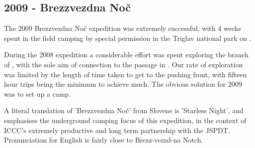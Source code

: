 \begin{tcolorbox}
\chapter{2009 - Brezzvezdna Noč}

The 2009 Brezzvezdna Noč expedition was extremely successful, with 4
weeks spent in the field camping by special permission in the Triglav
national park on . 

During the 2008 expedition a considerable effort was spent exploring the
 branch of , with the sole aim of
connection to the passage in . Our rate of exploration was
limited by the length of time taken to get to the pushing front, with
fifteen hour trips being the minimum to achieve much. The obvious
solution for 2009 was to set up a camp.

A literal translation of 'Brezzvezdna Noč' from Slovene is 'Starless Night', and emphasises the underground camping focus of this expedition, in the context of ICCC's extremely productive and long term partnership with the JSPDT. Pronunciation for English is fairly close to Brezz-vezzd-na Notch.

\end{tcolorbox}
\BgThispage










